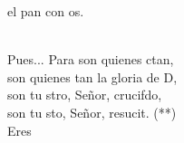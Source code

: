 \begin{cancion}
	el pan con os.\\
	\jumjump\\
	\begin{chorus}%
		Pues... Para  son quienes ctan,\\
		son quienes tan la gloria de D,\\
		son tu stro, Señor, crucifdo,\\
		son tu sto, Señor, resucit. (**)\\
		Eres  \jump\\
	\end{chorus}%
\end{cancion}%
